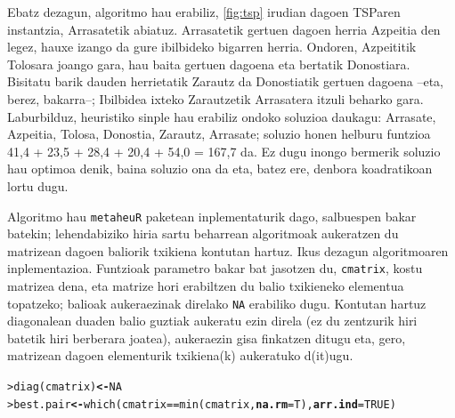 \documentclass[eu]{ifirak}\usepackage[]{graphicx}\usepackage[]{color}
\makeatletter
\newcommand{\hlnum}[1]{\textcolor[rgb]{0.659,0.4,0.051}{#1}}%
\newcommand{\hlopt}[1]{\textcolor[rgb]{0,0,0}{#1}}%
\newcommand{\hlstd}[1]{\textcolor[rgb]{0,0,0}{#1}}%
\newcommand{\hlkwb}[1]{\textcolor[rgb]{0.549,0.114,0.412}{\textbf{#1}}}%
\newcommand{\hlkwc}[1]{\textcolor[rgb]{0.659,0.573,0.133}{\textbf{#1}}}%
\newcommand{\hlkwd}[1]{\textcolor[rgb]{0.659,0.133,0.482}{#1}}%
\newenvironment{kframe}{%
 \def\at@end@of@kframe{}%
 \ifinner\ifhmode%
  \def\at@end@of@kframe{\end{minipage}}%
  \begin{minipage}{\columnwidth}%
 \fi\fi%
 \def\FrameCommand##1{\hskip\@totalleftmargin \hskip-\fboxsep
 \colorbox{shadecolor}{##1}\hskip-\fboxsep
     \hskip-\linewidth \hskip-\@totalleftmargin \hskip\columnwidth}%
 \MakeFramed {\advance\hsize-\width
   \@totalleftmargin\z@ \linewidth\hsize
   \@setminipage}}%
 {\par\unskip\endMakeFramed%
 \at@end@of@kframe}
\newenvironment{knitrout}{}{} %
\newcommand{\code}[1]{\texttt{#1}}
\makeatother
\begin{document}
Ebatz dezagun, algoritmo hau erabiliz, \ref{fig:tsp} irudian dagoen TSParen instantzia, Arrasatetik abiatuz. Arrasatetik gertuen dagoen herria Azpeitia den legez, hauxe izango da gure ibilbideko bigarren herria. Ondoren, Azpeititik Tolosara joango gara, hau baita gertuen dagoena eta  bertatik Donostiara. Bisitatu barik dauden herrietatik Zarautz da Donostiatik gertuen dagoena --eta, berez, bakarra--; Ibilbidea ixteko Zarautzetik Arrasatera itzuli beharko gara. Laburbilduz, heuristiko sinple hau erabiliz ondoko soluzioa daukagu: Arrasate, Azpeitia, Tolosa, Donostia, Zarautz, Arrasate; soluzio honen helburu funtzioa 41,4 + 23,5 + 28,4 + 20,4 + 54,0 = 167,7 da. Ez dugu inongo bermerik soluzio hau optimoa denik, baina soluzio ona da eta, batez ere, denbora koadratikoan lortu dugu.
%
%

Algoritmo hau \code{metaheuR} paketean inplementaturik dago, salbuespen bakar batekin; lehendabiziko hiria sartu beharrean algoritmoak aukeratzen du matrizean dagoen baliorik txikiena kontutan hartuz. Ikus dezagun algoritmoaren inplementazioa. Funtzioak parametro bakar bat jasotzen du, \code{cmatrix}, kostu matrizea dena, eta matrize hori erabiltzen du balio txikieneko elementua topatzeko; balioak aukeraezinak direlako \code{NA} erabiliko dugu. Kontutan hartuz diagonalean duaden balio guztiak aukeratu ezin direla (ez du zentzurik hiri batetik hiri berberara joatea), aukeraezin gisa finkatzen ditugu eta, gero, matrizean dagoen elementurik txikiena(k) aukeratuko d(it)ugu.

\begin{knitrout}
\color{fgcolor}\begin{kframe}
\begin{alltt}
\hlstd{> }\hlkwd{diag}\hlstd{(cmatrix)} \hlkwb{<-} \hlnum{NA}
\hlstd{> }\hlstd{best.pair} \hlkwb{<-} \hlkwd{which}\hlstd{(cmatrix} \hlopt{==} \hlkwd{min}\hlstd{(cmatrix,}\hlkwc{na.rm}\hlstd{=T),} \hlkwc{arr.ind}\hlstd{=}\hlnum{TRUE}\hlstd{)}
\end{alltt}
\end{kframe}
\end{knitrout}
\end{document}
